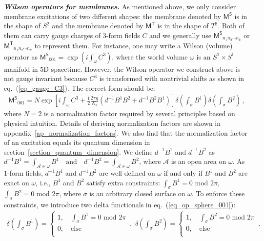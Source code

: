 \documentclass[11pt,nofootinbib,preprint]{revtex4-1}
\begin{document}
\textbf{\textit{Wilson operators for membranes.}}
As mentioned above, we only consider   membrane excitations of two different shapes: the membrane denoted by $\mathsf{M^S}$ is in the shape of $S^2$ and the membrane denoted by $\mathsf{M^T}$ is in the shape of $T^2$. Both of them can carry gauge charges of 3-form fields $C$ and we generally use $\mathsf{M^S}_{n_{1}n_{2}\cdots n_{k}}$ or $\mathsf{M^T}_{n_{1}n_{2}\cdots n_{k}}$ to represent them. For instance, one may write a Wilson (volume) operator as $
	\mathsf{M^S}_{001}=\exp \left( i\int_{\omega}{C^3} \right)$,  where the world volume $\omega$ is an $S^2\times S^1$ manifold in $5$D spacetime. However, the Wilson operator we construct above is not gauge invariant because $C^3$ is transformed with nontrivial shifts as shown in eq.~(\ref{eq_gauge_C3}). The correct form should be:
\begin{align}
	\mathsf{M^S}_{001}=N\exp \left[ i\int_{\omega}{C^3+\frac{1}{2}\frac{2\pi q}{N_3}\left( d^{-1}B^1B^2+d^{-1}B^2B^1 \right)} \right] \delta \left( \int_{\sigma}{B^1} \right) \delta \left( \int_{\sigma}{B^2} \right) \,,
	\label{eq_op_sphere_001}
\end{align}
where $N=2$ is a normalization factor required by several principles based on physical intuition. Details of deriving normalization factors are shown in appendix~\ref{ap_normalization_factors}. We also find that the normalization factor of an excitation equals its quantum dimension in section~\ref{section_quantum_dimension}. We define $d^{-1}B^1$ and $d^{-1}B^2$ as
$d^{-1}B^1=\int_{\mathcal{A} \in \omega}{B^1} \quad\text{and}\quad d^{-1}B^2=\int_{\mathcal{A} \in \omega}{B^2}$, where $\mathcal{A}$ is an open area on $\omega$. As 1-form fields, $d^{-1}B^1$ and $d^{-1}B^2$ are well defined on $\omega$ if and only if $B^1$ and $B^2$ are exact on $\omega$, i.e., $B^1$ and $B^2$ satisfy extra constraints:  $\int_{\sigma}{B^1}=0$ mod $2\pi$, $\int_{\sigma}{B^2}=0$ mod $2\pi$, where $\sigma$ is an arbitrary closed surface on $\omega$. To enforce these constraints, we introduce two  delta functionals in eq.~(\ref{eq_op_sphere_001}):
\begin{align}
	\delta \left( \int_{\sigma}{B^1} \right) =\begin{cases}
		1, \quad \int_{\sigma}{B^1}=0   \,\, \mathrm{mod}\,\, 2\pi\\
		0, \quad \mathrm{else}\\
	\end{cases}\,,\,\,
	\delta \left( \int_{\sigma}{B^2} \right) =\begin{cases}
		1, \quad \int_{\sigma}{B^2}=0 \,\,  \mathrm{mod} \,\, 2\pi\\
		0, \quad \mathrm{else}\\
	\end{cases}\,.
\end{align}
\end{document}
